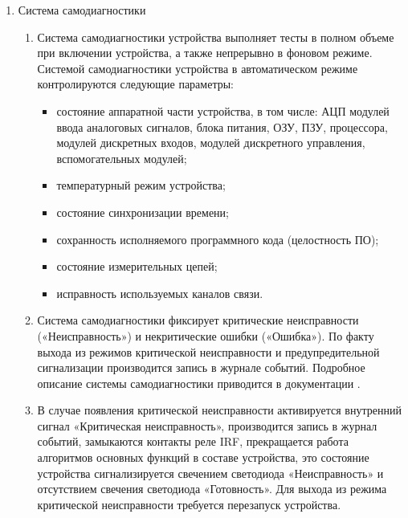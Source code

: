 \begin{enumerate}[label=\arabic{section}.\arabic{subsection}.\arabic*, labelsep=4pt, leftmargin=0pt, itemindent=57pt]
\begin{enumerate}[label=\arabic{section}.\arabic{subsection}.\arabic{enumi}.\arabic*, labelsep=4pt, leftmargin=0em, itemindent=65pt, parsep=0pt]
\end{enumerate}

\item Система самодиагностики
\begin{enumerate}[label=\arabic{section}.\arabic{subsection}.\arabic{enumi}.\arabic*, labelsep=4pt, leftmargin=0em, itemindent=65pt, parsep=0pt]

\item
Система самодиагностики устройства выполняет тесты в полном объеме при включении устройства, а также непрерывно в фоновом режиме.
Системой самодиагностики устройства в автоматическом режиме контролируются следующие параметры:
\begin{itemize}
\item состояние аппаратной части устройства, в том числе: АЦП модулей ввода аналоговых сигналов, блока питания, ОЗУ, ПЗУ, процессора, модулей дискретных входов, модулей дискретного управления, вспомогательных модулей;
\item температурный режим устройства;
\item состояние синхронизации времени;
\item сохранность исполняемого программного кода (целостность ПО);
\item состояние измерительных цепей;
\item исправность используемых каналов связи.
\end{itemize}

\item
Система самодиагностики фиксирует критические неисправности («Неисправность») и некритические ошибки («Ошибка»).
По факту выхода из режимов критической неисправности и предупредительной сигнализации производится запись в журнале событий.
Подробное описание системы самодиагностики приводится в документации \ManualUnitGeneral.

\item
В случае появления критической неисправности активируется внутренний сигнал «Критическая неисправность», производится запись в журнал событий, замыкаются контакты реле IRF, прекращается работа алгоритмов основных функций в составе устройства, это состояние устройства сигнализируется свечением светодиода «Неисправность» и отсутствием свечения светодиода «Готовность».
Для выхода из режима критической неисправности требуется перезапуск устройства.


\end{enumerate}
\end{enumerate}
